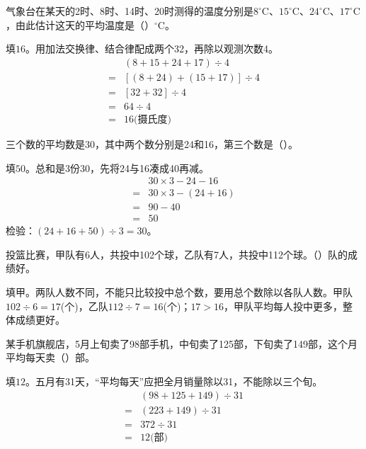 气象台在某天的2时、8时、14时、20时测得的温度分别是\(8^\circ\mathrm C\)、\(15^\circ\mathrm C\)、\(24^\circ\mathrm C\)、\(17^\circ\mathrm C\)，由此估计这天的平均温度是（\hspace{1.8em}）\({}^\circ\mathrm C\)。\par
\begin{BookAnswer}
填\(16\)。用加法交换律、结合律配成两个32，再除以观测次数4。\[\begin{aligned}&(8+15+24+17)\div4\\={}&[(8+24)+(15+17)]\div4\\={}&[32+32]\div4\\={}&64\div4\\={}&16\text{(摄氏度)}\end{aligned}\]
\end{BookAnswer}

三个数的平均数是30，其中两个数分别是24和16，第三个数是（\hspace{1.8em}）。\par
\begin{BookAnswer}
填\(50\)。总和是3份30，先将24与16凑成40再减。\[\begin{aligned}&30\times3-24-16\\={}&30\times3-(24+16)\\={}&90-40\\={}&50\end{aligned}\]检验：\((24+16+50)\div3=30\)。
\end{BookAnswer}

投篮比赛，甲队有6人，共投中102个球，乙队有7人，共投中112个球。（\hspace{1.8em}）队的成绩好。\par
\begin{BookAnswer}
填甲。两队人数不同，不能只比较投中总个数，要用总个数除以各队人数。甲队\(102\div6=17\)(个)，乙队\(112\div7=16\)(个)；\allowbreak{}\(17>16\)，甲队平均每人投中更多，整体成绩更好。
\end{BookAnswer}

某手机旗舰店，5月上旬卖了98部手机，中旬卖了125部，下旬卖了149部，这个月平均每天卖（\hspace{1.8em}）部。\par
\begin{BookAnswer}
填\(12\)。五月有31天，“平均每天”应把全月销量除以31，不能除以三个旬。\[\begin{aligned}&(98+125+149)\div31\\={}&(223+149)\div31\\={}&372\div31\\={}&12\text{(部)}\end{aligned}\]
\end{BookAnswer}

